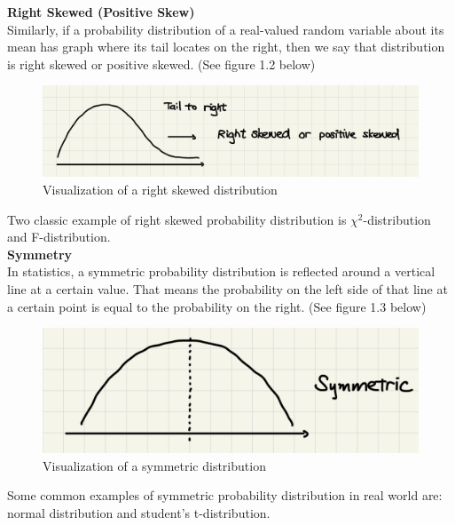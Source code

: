 \noindent
\textbf{Right Skewed (Positive Skew)}\\

\noindent
Similarly, if a probability distribution of a real-valued random variable about its mean has graph where its tail locates on the right, then we say that distribution is right skewed or positive skewed. (See figure 1.2 below)

\begin{figure}[H]
 \centering
 \includegraphics[scale=0.25]{Section1/img/RightSkewed.jpg}
 \caption{Visualization of a right skewed distribution}
\end{figure}

\noindent
Two classic example of right skewed probability distribution is $\chi^{2}$-distribution and F-distribution.\\

\noindent
\textbf{Symmetry}\\

\noindent
In statistics, a symmetric probability distribution is reflected around a vertical line at a certain value. That means the probability on the left side of that line at a certain point is equal to the probability on the right. (See figure 1.3 below)

\begin{figure}[H]
 \centering
 \includegraphics[scale=0.25]{Section1/img/Symmetric.jpg}
 \caption{Visualization of a symmetric distribution}
\end{figure}

\noindent
Some common examples of symmetric probability distribution in real world are: normal distribution and student's t-distribution.\\

